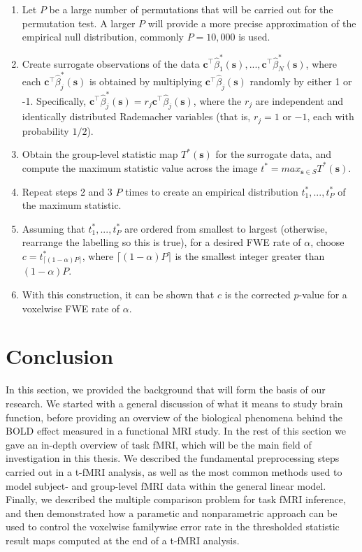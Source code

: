 \begin{enumerate}
	\item Let $P$ be a large number of permutations that will be carried out for the permutation test. A larger $P$ will provide a more precise approximation of the empirical null distribution, commonly $P = 10,000$ is used.  
	\item Create surrogate observations of the data $\bm{c}^{\intercal}\hat{\beta}^{*}_{1}(\bm{s}), ..., \bm{c}^{\intercal}\hat{\beta}^{*}_{N}(\bm{s})$, where each $\bm{c}^{\intercal}\hat{\beta}^{*}_{j}(\bm{s})$ is obtained by multiplying $\bm{c}^{\intercal}\hat{\beta}_{j}(\bm{s})$ randomly by either 1 or -1. Specifically, $\bm{c}^{\intercal}\hat{\beta}^{*}_{j}(\bm{s}) = r_j \bm{c}^{\intercal}\hat{\beta}_{j}(\bm{s})$, where the $r_j$ are independent and identically distributed Rademacher variables (that is, $r_j = 1$ or $-1$, each with probability $1/2$).
	\item Obtain the group-level statistic map $T^{*}(\bm{s})$ for the surrogate data, and compute the maximum statistic value across the image $t^{*} = max_{\bm{s} \in S} T^{*}(\bm{s})$. 
	\item Repeat steps 2 and 3 $P$ times to create an empirical distribution $t^{*}_{1}, ..., t^{*}_{P}$ of the maximum statistic. 
	\item Assuming that $t^{*}_{1}, ..., t^{*}_{P}$ are ordered from smallest to largest (otherwise, rearrange the labelling so this is true), for a desired FWE rate of $\alpha$, choose $c = t^{*}_{\lceil (1 -\alpha) P \rceil}$, where $\lceil (1 -\alpha) P \rceil$ is the smallest integer greater than $(1 -\alpha) P$.
	\item With this construction, it can be shown that $c$ is the corrected $p$-value for a voxelwise FWE rate of $\alpha$.
\end{enumerate}

\pagebreak

\section{Conclusion}
In this section, we provided the background that will form the basis of our research. We started with a general discussion of what it means to study brain function, before providing an overview of the biological phenomena behind the BOLD effect measured in a functional MRI study.  In the rest of this section we gave an in-depth overview of task fMRI, which will be the main field of investigation in this thesis. We described the fundamental preprocessing steps carried out in a t-fMRI analysis, as well as the most common methods used to model subject- and group-level fMRI data within the general linear model. Finally, we described the multiple comparison problem for task fMRI inference, and then demonstrated how a parametic and nonparametric approach can be used to control the voxelwise familywise error rate in the thresholded statistic result maps computed at the end of a t-fMRI analysis. 